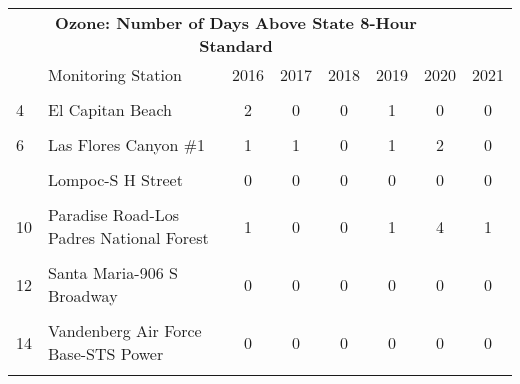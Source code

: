 \begin{table}
\centering
\begin{tabular}{llcccccc}
\toprule
\multicolumn{7}{c}{\textbf{Ozone: Number of Days Above State 8-Hour Standard}} \\
\cmidrule(l{3pt}r{3pt}){1-7}
  & Monitoring Station & 2016 & 2017 & 2018 & 2019 & 2020 & 2021\\
\midrule
\textbf{\cellcolor{gray!6}{3}} & \textbf{\cellcolor{gray!6}{Carpinteria-Gobernador Road}} & \textbf{\cellcolor{gray!6}{0}} & \textbf{\cellcolor{gray!6}{0}} & \textbf{\cellcolor{gray!6}{0}} & \textbf{\cellcolor{gray!6}{0}} & \textbf{\cellcolor{gray!6}{2}} & \textbf{\cellcolor{gray!6}{0}}\\
4 & El Capitan Beach & 2 & 0 & 0 & 1 & 0 & 0\\
\cellcolor{gray!6}{5} & \cellcolor{gray!6}{Goleta-Fairview} & \cellcolor{gray!6}{1} & \cellcolor{gray!6}{0} & \cellcolor{gray!6}{0} & \cellcolor{gray!6}{0} & \cellcolor{gray!6}{0} & \cellcolor{gray!6}{0}\\
6 & Las Flores Canyon \#1 & 1 & 1 & 0 & 1 & 2 & 0\\
\cellcolor{gray!6}{7} & \cellcolor{gray!6}{Lompoc-HSandP} & \cellcolor{gray!6}{0} & \cellcolor{gray!6}{1} & \cellcolor{gray!6}{0} & \cellcolor{gray!6}{0} & \cellcolor{gray!6}{0} & \cellcolor{gray!6}{0}\\
\addlinespace
8 & Lompoc-S H Street & 0 & 0 & 0 & 0 & 0 & 0\\
\cellcolor{gray!6}{9} & \cellcolor{gray!6}{Nojoqui Pass} & \cellcolor{gray!6}{0} & \cellcolor{gray!6}{0} & \cellcolor{gray!6}{0} & \cellcolor{gray!6}{0} & \cellcolor{gray!6}{0} & \cellcolor{gray!6}{0}\\
10 & Paradise Road-Los Padres National Forest & 1 & 0 & 0 & 1 & 4 & 1\\
\cellcolor{gray!6}{11} & \cellcolor{gray!6}{Santa Barbara-700 East Canon Perdido} & \cellcolor{gray!6}{1} & \cellcolor{gray!6}{0} & \cellcolor{gray!6}{0} & \cellcolor{gray!6}{0} & \cellcolor{gray!6}{2} & \cellcolor{gray!6}{0}\\
12 & Santa Maria-906 S Broadway & 0 & 0 & 0 & 0 & 0 & 0\\
\addlinespace
\cellcolor{gray!6}{13} & \cellcolor{gray!6}{Santa Ynez-Airport Road} & \cellcolor{gray!6}{0} & \cellcolor{gray!6}{0} & \cellcolor{gray!6}{0} & \cellcolor{gray!6}{0} & \cellcolor{gray!6}{0} & \cellcolor{gray!6}{0}\\
14 & Vandenberg Air Force Base-STS Power & 0 & 0 & 0 & 0 & 0 & 0\\
\cellcolor{gray!6}{15} & \cellcolor{gray!6}{Countywide} & \cellcolor{gray!6}{3} & \cellcolor{gray!6}{0} & \cellcolor{gray!6}{0} & \cellcolor{gray!6}{1} & \cellcolor{gray!6}{6} & \cellcolor{gray!6}{1}\\
\bottomrule
\end{tabular}
\end{table}
